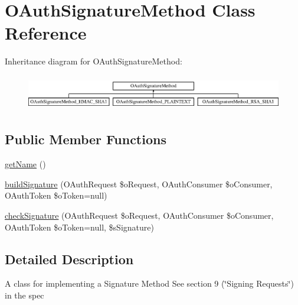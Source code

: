 \hypertarget{class_o_auth_signature_method}{\section{O\-Auth\-Signature\-Method Class Reference}
\label{class_o_auth_signature_method}
}
Inheritance diagram for O\-Auth\-Signature\-Method\-:\begin{figure}[H]
\begin{center}
\leavevmode
\includegraphics[height=1.575246cm]{class_o_auth_signature_method}
\end{center}
\end{figure}
\subsection*{Public Member Functions}
\begin{DoxyCompactItemize}
\item 
\hyperlink{class_o_auth_signature_method_ad42c31991e3a144fd7ac46bb268df758}{get\-Name} ()
\item 
\hyperlink{class_o_auth_signature_method_a72f2a7ccf70732c7359c2539815bf32d}{build\-Signature} (O\-Auth\-Request \$o\-Request, O\-Auth\-Consumer \$o\-Consumer, O\-Auth\-Token \$o\-Token=null)
\item 
\hyperlink{class_o_auth_signature_method_aedd9a3e183880b2d1ea47fe06c988240}{check\-Signature} (O\-Auth\-Request \$o\-Request, O\-Auth\-Consumer \$o\-Consumer, O\-Auth\-Token \$o\-Token=null, \$s\-Signature)
\end{DoxyCompactItemize}


\subsection{Detailed Description}
A class for implementing a Signature Method See section 9 (\char`\"{}\-Signing Requests\char`\"{}) in the spec 

